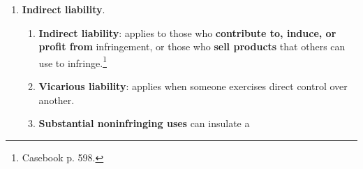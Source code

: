\begin{enumerate}
\begin{enumerate}
\begin{enumerate}
\begin{enumerate}
                structural parts of the allegedly infringing program.
            \end{enumerate}
        \end{enumerate}
        \item \textbf{Derivative works}: owner has the exclusive right. \S\ 
        106(2). Stock scenes and characters are not copyrightable, but 
        specific characters are. \emph{Anderson v. Stallone}.
        \item \textbf{Distribution}: owner has exclusive right---but the right 
        extends only to the \textbf{first sale}. \emph{Kirtsaeng v. Wiley}.
        \item \textbf{Public performance and display}:
        \begin{enumerate}
            \item 1972: no public performance rights for \emph{analog} sound 
            recordings. But there are performance rights for \emph{digital} 
            sound recordings (1995).
            \item \textbf{Public interest exemption} (\S\ 110): generally 
            applies to educational, free, or charitable performances and 
            displays.\footnote{Casebook p. 592.} Fairness in Music Licensing 
            Act (1998) broadened exemptions for homes, small business, 
            restaurants, and certain larger establishments.
            \item \textbf{Compulsory licenses}---five areas: cable, satellite, 
            jukeboxes, public broadcasting, webcasting.\footnote{Casebook p. 
            593--92.}
            \item \textbf{Moral rights}: applies only to visual works. 
            Resulted from Berne, 1990.
        \end{enumerate}
    \end{enumerate}
    \item \textbf{Indirect liability}.
    \begin{enumerate}
        \item \textbf{Indirect liability}: applies to those who 
        \textbf{contribute to, induce, or profit from} infringement, or those 
        who \textbf{sell products} that others can use to 
        infringe.\footnote{Casebook p. 598.}
        \item \textbf{Vicarious liability}: applies when someone exercises 
        direct control over another.
        \item \textbf{Substantial noninfringing uses} can insulate a 

\end{enumerate}
\end{enumerate}
